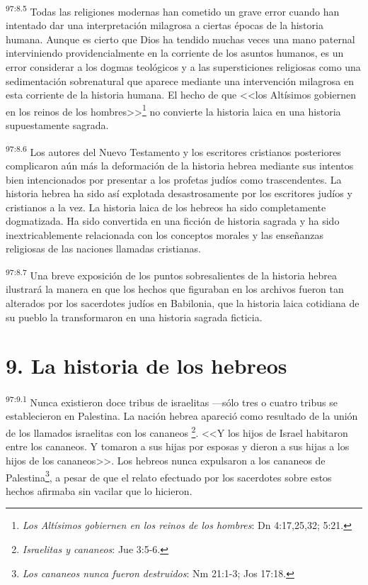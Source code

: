 \par
\textsuperscript{97:8.5} Todas las religiones modernas han cometido un grave error cuando han intentado dar una interpretación milagrosa a ciertas épocas de la historia humana. Aunque es cierto que Dios ha tendido muchas veces una mano paternal interviniendo providencialmente en la corriente de los asuntos humanos, es un error considerar a los dogmas teológicos y a las supersticiones religiosas como una sedimentación sobrenatural que aparece mediante una intervención milagrosa en esta corriente de la historia humana. El hecho de que <<los Altísimos gobiernen en los reinos de los hombres>>\footnote{\textit{Los Altísimos gobiernen en los reinos de los hombres}: Dn 4:17,25,32; 5:21.} no convierte la historia laica en una historia supuestamente sagrada.

\par
\textsuperscript{97:8.6} Los autores del Nuevo Testamento y los escritores cristianos posteriores complicaron aún más la deformación de la historia hebrea mediante sus intentos bien intencionados por presentar a los profetas judíos como trascendentes. La historia hebrea ha sido así explotada desastrosamente por los escritores judíos y cristianos a la vez. La historia laica de los hebreos ha sido completamente dogmatizada. Ha sido convertida en una ficción de historia sagrada y ha sido inextricablemente relacionada con los conceptos morales y las enseñanzas religiosas de las naciones llamadas cristianas.

\par
\textsuperscript{97:8.7} Una breve exposición de los puntos sobresalientes de la historia hebrea ilustrará la manera en que los hechos que figuraban en los archivos fueron tan alterados por los sacerdotes judíos en Babilonia, que la historia laica cotidiana de su pueblo la transformaron en una historia sagrada ficticia.

\section*{9. La historia de los hebreos}
\par
\textsuperscript{97:9.1} Nunca existieron doce tribus de israelitas ---sólo tres o cuatro tribus se establecieron en Palestina. La nación hebrea apareció como resultado de la unión de los llamados israelitas con los cananeos \footnote{\textit{Israelitas y cananeos}: Jue 3:5-6.}. <<Y los hijos de Israel habitaron entre los cananeos. Y tomaron a sus hijas por esposas y dieron a sus hijas a los hijos de los cananeos>>. Los hebreos nunca expulsaron a los cananeos de Palestina\footnote{\textit{Los cananeos nunca fueron destruidos}: Nm 21:1-3; Jos 17:18.}, a pesar de que el relato efectuado por los sacerdotes sobre estos hechos afirmaba sin vacilar que lo hicieron.

